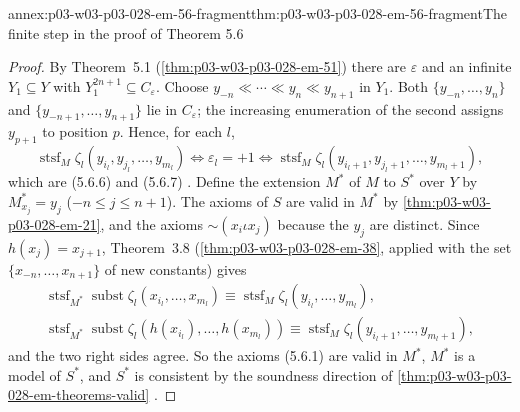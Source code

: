\begin{annexitem}{annex:p03-w03-p03-028-em-56-fragment}{thm:p03-w03-p03-028-em-56-fragment}{The finite step in the proof of Theorem 5.6}
\begin{proof}
By Theorem~5.1 (\cref{thm:p03-w03-p03-028-em-51}) there are \(\varepsilon\) and
an infinite \(Y_1\subseteq Y\) with \(Y_1^{2n+1}\subseteq C_\varepsilon\).
Choose \(y_{-n}\ll\cdots\ll y_n\ll y_{n+1}\) in \(Y_1\).  Both
\(\{y_{-n},\ldots,y_n\}\) and \(\{y_{-n+1},\ldots,y_{n+1}\}\) lie in
\(C_\varepsilon\); the increasing enumeration of the second assigns
\(y_{p+1}\) to position \(p\).  Hence, for each \(l\),
\[
  \operatorname{stsf}_M\zeta_l(y_{i_l},y_{j_l},\ldots,y_{m_l})
  \iff\varepsilon_l=+1\iff
  \operatorname{stsf}_M\zeta_l(y_{i_l+1},y_{j_l+1},\ldots,y_{m_l+1}),
\]
which are (5.6.6) and (5.6.7) \cite[p.~62]{EhrenfeuchtMostowski1956}.  Define
the extension \(M^*\) of \(M\) to \(S^*\) over \(Y\) by \(M^*_{x_j}=y_j\)
(\(-n\leq j\leq n+1\)).  The axioms of \(S\) are valid in \(M^*\) by
\cref{thm:p03-w03-p03-028-em-21}, and the axioms
\(\mathord\sim(x_i\iota x_j)\) because the \(y_j\) are distinct.  Since
\(h(x_j)=x_{j+1}\), Theorem~3.8 (\cref{thm:p03-w03-p03-028-em-38}, applied with
the set \(\{x_{-n},\ldots,x_{n+1}\}\) of new constants) gives
\begin{gather*}
  \operatorname{stsf}_{M^*}\operatorname{subst}\zeta_l(x_{i_l},\ldots,x_{m_l})
  \equiv\operatorname{stsf}_M\zeta_l(y_{i_l},\ldots,y_{m_l}),\\
  \operatorname{stsf}_{M^*}\operatorname{subst}\zeta_l(h(x_{i_l}),\ldots,h(x_{m_l}))
  \equiv\operatorname{stsf}_M\zeta_l(y_{i_l+1},\ldots,y_{m_l+1}),
\end{gather*}
and the two right sides agree.  So the axioms (5.6.1) are valid in \(M^*\),
\(M^*\) is a model of \(S^*\), and \(S^*\) is consistent by the soundness
direction of \cref{thm:p03-w03-p03-028-em-theorems-valid}
\cite[p.~62]{EhrenfeuchtMostowski1956}.
\end{proof}
\end{annexitem}

